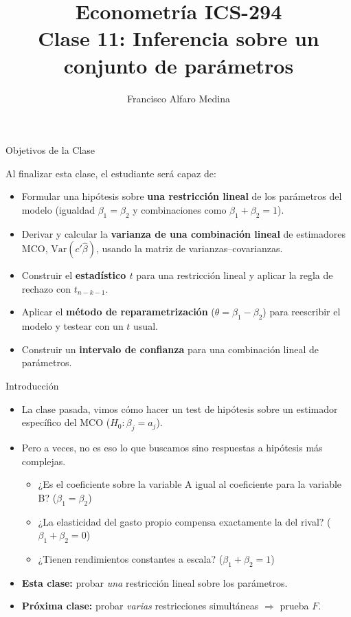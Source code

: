 \documentclass{beamer}
\title[ICS-294]{Econometría ICS-294\\ \small{Clase 11: Inferencia sobre un conjunto de parámetros}}
\author{Francisco Alfaro Medina}
\institute[USM]
{Universidad Técnica Federico Santa María\\ %
	\medskip
	\textit{francisco.alfaro@usm.cl} %

}
\date{}
\begin{document}
\begin{frame}
	\titlepage %


\end{frame}
\logo{}

\begin{frame}{Objetivos de la Clase}

Al finalizar esta clase, el estudiante será capaz de:

\begin{itemize}
    \item[\checkmark] Formular una hipótesis sobre \textbf{una restricción lineal} de los parámetros del modelo (igualdad $\beta_1=\beta_2$ y combinaciones como $\beta_1+\beta_2=1$).
    \item[\checkmark] Derivar y calcular la \textbf{varianza de una combinación lineal} de estimadores MCO, $\text{Var}(c'\hat{\beta})$, usando la matriz de varianzas--covarianzas.
    \item[\checkmark] Construir el \textbf{estadístico $t$} para una restricción lineal y aplicar la regla de rechazo con $t_{n-k-1}$.
    \item[\checkmark] Aplicar el \textbf{método de reparametrización} ($\theta=\beta_1-\beta_2$) para reescribir el modelo y testear con un $t$ usual.
    \item[\checkmark] Construir un \textbf{intervalo de confianza} para una combinación lineal de parámetros.
\end{itemize}

\end{frame}

\begin{frame}{Introducción}
    \begin{itemize}
        \item La clase pasada, vimos cómo hacer un test de hipótesis sobre un estimador específico del MCO ($H_0:\beta_j=a_j$).
        \item Pero a veces, no es eso lo que buscamos sino respuestas a hipótesis más complejas.
            \begin{itemize}
                \item ¿Es el coeficiente sobre la variable A igual al coeficiente para la variable B? ($\beta_1=\beta_2$)
                \item ¿La elasticidad del gasto propio compensa exactamente la del rival? ($\beta_1+\beta_2=0$)
                \item ¿Tienen rendimientos constantes a escala? ($\beta_1+\beta_2=1$)
            \end{itemize}
        \item \textbf{Esta clase:} probar \textit{una} restricción lineal sobre los parámetros.
        \item \textbf{Próxima clase:} probar \textit{varias} restricciones simultáneas $\Rightarrow$ prueba $F$.
    \end{itemize}
\end{frame}
\end{document}
